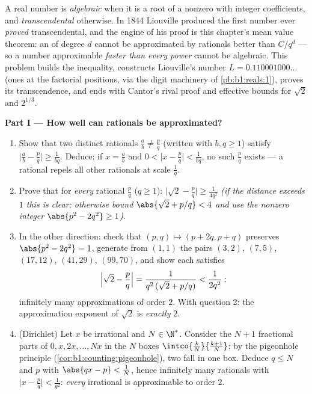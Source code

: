 \begin{problem}
\label{pb:b1:derivative:1}
A real number is \emph{algebraic} when it is a root of a nonzero
 with integer coefficients, and \emph{transcendental}
otherwise. In 1844 Liouville produced the first number ever
\emph{proved} transcendental, and the engine of his proof is this
chapter's mean value theorem: an  of degree $d$
cannot be approximated by rationals better than $C/q^d$ --- so a
number approximable \emph{faster than every power} cannot be
algebraic. This problem builds the inequality, constructs
Liouville's number $L = 0.110001000\dots$ (ones at the factorial
positions, via the digit machinery of \cref{pb:b1:reals:1}),
proves its transcendence, and ends with Cantor's rival proof and
effective bounds for $\sqrt2$ and
$2^{1/3}$.

\medskip
\noindent\textbf{Part I --- How well can rationals be
approximated?}
\begin{enumerate}
  \item Show that two distinct rationals $\frac ab \neq \frac pq$
        (written with $b, q \geq 1$) satisfy $\bigl|\frac ab -
        \frac pq\bigr| \geq \frac{1}{bq}$. Deduce: if $x =
        \frac ab$ and $0 < \bigl|x - \frac pq\bigr| <
        \frac{1}{bq}$, no such $\frac pq$ exists --- a rational
        repels all other rationals at scale $\frac 1q$.
  \item Prove that for \emph{every} rational $\frac pq$ ($q \geq
        1$): $\bigl|\sqrt2 - \frac pq\bigr| \geq
        \frac{1}{4q^2}$ \emph{(if the distance exceeds $1$ this
        is clear; otherwise bound $\abs{\sqrt2 + p/q} < 4$ and
        use the nonzero integer $\abs{p^2 - 2q^2} \geq 1$)}.
  \item In the other direction: check that $(p, q) \mapsto (p +
        2q, p + q)$ preserves $\abs{p^2 - 2q^2} = 1$, generate
        from $(1,1)$ the pairs $(3,2)$, $(7,5)$, $(17,12)$,
        $(41,29)$, $(99,70)$, and show each satisfies
        \[
        \Bigl|\sqrt2 - \frac pq\Bigr| =
        \frac{1}{q^2\,(\sqrt2 + p/q)} < \frac{1}{2q^2} :
        \]
        infinitely many approximations of order $2$. With
        question 2: the approximation exponent of $\sqrt 2$ is
        \emph{exactly} $2$.
  \item (Dirichlet) Let $x$ be irrational and $N \in \N^*$.
        Consider the $N + 1$ fractional parts of $0, x, 2x,
        \dots, Nx$ in the $N$ boxes $\intco{\frac kN}{\frac{k +
        1}{N}}$: by the pigeonhole principle
        (\cref{cor:b1:counting:pigeonhole}), two fall in one box.
        Deduce $q \leq N$ and $p$ with $\abs{qx - p} <
        \frac 1N$, hence infinitely many rationals with
        $\bigl|x - \frac pq\bigr| < \frac{1}{q^2}$: \emph{every}
        irrational is approximable to order $2$.
\end{enumerate}


\end{problem}
